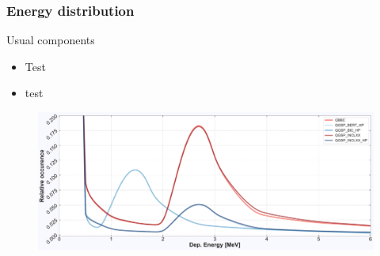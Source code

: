 \begin{frame}
\frametitle{Energy distribution}

\begin{block}{Usual components}
	\begin{itemize}
		\item Test
		\item test
	\end{itemize}
\end{block}

\begin{figure}
	\includegraphics[width=\textwidth]{images/energy_dist_full_concat_E120.pdf}
\end{figure}

\end{frame}